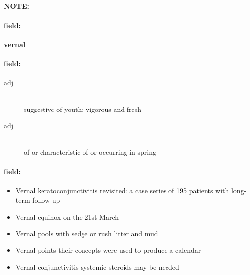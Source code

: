 \documentclass[12pt]{article}
\newenvironment{note}{\paragraph{NOTE:}}{}
\newenvironment{field}{\paragraph{field:}}{}
\begin{document}
\begin{note}
\begin{field}
\textbf{\large vernal}
\end{field}


\begin{field}
\begin{description}
\item[adj] \hfill \\ 
suggestive of youth; vigorous and fresh

\item[adj] \hfill \\ 
of or characteristic of or occurring in spring

\end{description}
\end{field}

\begin{field}
\begin{itemize}
\item Vernal keratoconjunctivitis revisited: a case series of 195 patients with long-term follow-up
\item Vernal equinox on the 21st March
\item Vernal pools with sedge or rush litter and mud
\item Vernal points their concepts were used to produce a calendar
\item Vernal conjunctivitis systemic steroids may be needed
\end{itemize}
\end{field}
\end{note}
\end{document}
